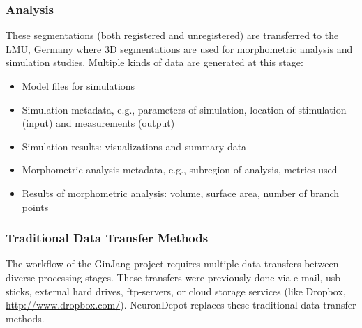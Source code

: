 \documentclass{frontiersSCNS} %
\begin{document}
\subsubsection{Analysis}

These segmentations (both registered and unregistered) are transferred to the
LMU, Germany where 3D segmentations are used for morphometric analysis and
simulation studies. Multiple kinds of data are generated at this
stage:

\begin{itemize}
\item Model files for simulations
\item Simulation metadata, e.g., parameters of simulation, location of
    stimulation (input) and measurements (output)
\item Simulation results: visualizations and summary data
\item Morphometric analysis metadata, e.g., subregion of analysis, metrics used
\item Results of morphometric analysis: volume, surface area, number of branch points
\end{itemize}


\subsubsection{Traditional Data Transfer Methods}

The workflow of the GinJang project requires multiple data transfers between
diverse processing stages. These transfers were previously done via e-mail,
usb-sticks, external hard drives, ftp-servers, or cloud storage services (like
Dropbox, \url{http://www.dropbox.com/}). NeuronDepot replaces these traditional data transfer methods.


\end{document}
